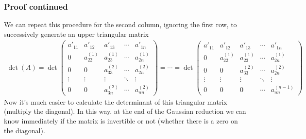 \documentclass[usenames,dvipsnames,aspectratio=169,10pt]{beamer}
\numberwithin{equation}{section}
\begin{document}
\begin{frame}
\frametitle{Proof continued}

We can repeat this procedure for the second column, ignoring the first row, to successively generate an upper triangular matrix
\begin{align*}
\det(A)=
\det\begin{pmatrix}
a'_{11} & a'_{12} & a'_{13} & \cdots & a'_{1n} \\
0 & a^{(1)}_{22} & a^{(1)}_{23} & \cdots & a^{(1)}_{2n} \\
0 & 0 & a^{(2)}_{33} & \cdots & a^{(2)}_{2n} \\
\vdots & \vdots & \vdots & \ddots & \vdots \\
0 & 0 & a^{(2)}_{3n} & \cdots & a^{(2)}_{nn}
\end{pmatrix}
=
\cdots
=
\det\begin{pmatrix}
a'_{11} & a'_{12} & a'_{13} & \cdots & a'_{1n} \\
0 & a^{(1)}_{22}  & a^{(1)}_{23} & \cdots & a^{(1)}_{2n} \\
0 & 0 & a^{(2)}_{33} & \cdots & a^{(2)}_{2n} \\
\vdots & \vdots & \vdots & \ddots & \vdots \\
0 & 0 & 0 & \cdots & a^{(n-1)}_{nn}
\end{pmatrix}
\end{align*}
Now it's much easier to calculate the determinant of this triangular matrix (multiply the diagonal). In this way, at the end of the Gaussian reduction we can know immediately if the matrix is invertible or not (whether there is a zero on the diagonal).
\end{frame}
\end{document}
